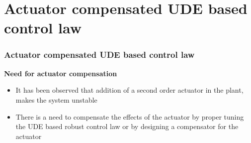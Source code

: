 \documentclass[table,10pt,red]{beamer}	%
\begin{document}
\section{Actuator compensated UDE based control law}
\begin{frame}
\frametitle{Actuator compensated UDE based control law}
\textbf{Need for actuator compensation}
\begin{itemize}  %
	
		\item It has been observed that addition of a second order actuator in the plant, makes the system unstable
		\item There is a need to compensate the effects of the actuator by proper tuning the UDE based robust control law or by  designing a compensator for the actuator
				
\end{itemize}
\end{frame}
\end{document}
